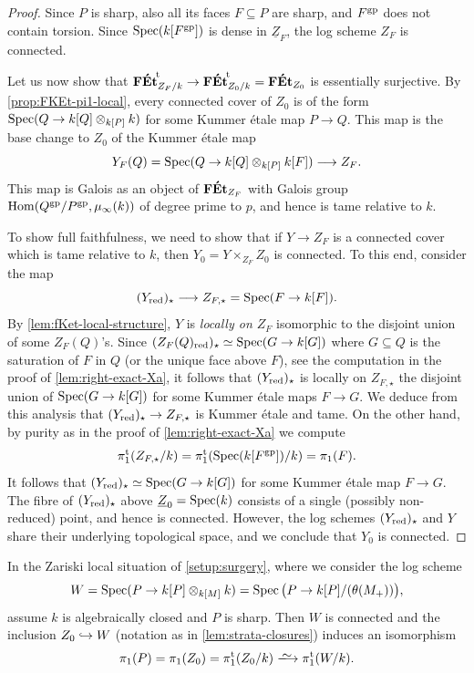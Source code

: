 \begin{proof}
Since $P$ is sharp, also all its faces $F \subseteq P$ are sharp, and $F^{\rm gp}$ does not contain torsion. Since $\operatorname{Spec}(k[F^{\rm gp}])$ is dense in $\underline{Z}_F$, the log scheme $Z_F$ is connected. 

Let us now show that ${\mathbf{F\acute{E}t}}^{\!\mathrm{t}}_{Z_F/k}\to {\mathbf{F\acute{E}t}}^{\!\mathrm{t}}_{Z_0/k} = \mathbf{F\acute{E}t}_{Z_0}$ is essentially surjective. By \cref{prop:FKEt-pi1-local}, every connected cover of $Z_0$ is of the form $\operatorname{Spec}(Q\to k[Q]\otimes_{k[P]} k)$ for some Kummer \'etale map $P\to Q$. This map is the base change to $Z_0$ of the Kummer \'etale map
\[
    Y_F(Q) = \operatorname{Spec}(Q \to k[Q] \otimes_{k[P]} k[F]) \longrightarrow Z_F.
\]
This map is Galois as an object of $\mathbf{F\acute{E}t}_{Z_F}$ with Galois group $\operatorname{Hom}(Q^{\rm gp}/P^{\rm gp},\mu_\infty(k))$ 
of degree prime to $p$, and hence is tame relative to $k$. 

To show full faithfulness, we need to show that if $Y \to Z_F$ is a connected cover which is tame relative to $k$, then $Y_0 = Y \times_{Z_F} Z_0$ is connected. To this end, consider the map 
\[
    (Y_{\rm red})_\star \longrightarrow Z_{F,\star} = \operatorname{Spec}(F \to k[F]).
\]
By \cref{lem:fKet-local-structure}, $Y$ is \emph{locally on $Z_F$} isomorphic to the disjoint union of some $Z_F(Q)$'s. Since $(Z_F(Q)_{\rm red})_\star \simeq \operatorname{Spec}(G\to k[G])$ where $G \subseteq Q$ is the saturation of $F$ in $Q$ (or the unique face above $F$), see the computation in the proof of \cref{lem:right-exact-Xa}, it follows that $(Y_{\rm red})_\star$ is locally on $Z_{F,\star}$ the disjoint union of $\operatorname{Spec}(G \to k[G])$ for some Kummer \'etale maps $F \to G$. We deduce from this analysis that $(Y_{\rm red})_\star \to Z_{F,\star}$ is Kummer \'etale and tame. 
On the other hand, by purity as in the proof of \cref{lem:right-exact-Xa} we compute 
\[
\pi_1^{\mathrm{t}}(Z_{F,\star}/k) = \pi_1^{\mathrm{t}}(\operatorname{Spec}(k[F^{\rm gp}])/k) = \pi_1(F).
\]
It follows that 
$(Y_{\rm red})_\star \simeq \operatorname{Spec}(G\to k[G])$
for some Kummer \'etale map $F\to G$. The fibre of $(Y_{\rm red})_\star$ above $\underline{Z}_0=\operatorname{Spec}(k)$ consists of a single (possibly non-reduced) point, and hence is connected. However, the log schemes $(Y_{\rm red})_\star$ and $Y$ share their underlying topological space, and we conclude that $Y_0$ is connected.
\end{proof}

\begin{cor} \label{cor:Paul}
    In the Zariski local situation of \cref{setup:surgery}, where we consider the log scheme  
    \[
         W = \operatorname{Spec}(P\to k[P]\otimes_{k[M]} k) = \operatorname{Spec}\big(P\to k[P]/(\theta(M_+))\big),
    \]  
    assume $k$ is algebraically closed and $P$ is sharp. Then $W$ is connected and the inclusion $Z_0 \hookrightarrow W$ (notation as in \cref{lem:strata-closures}) induces an isomorphism
    \[
        \pi_1(P) = \pi_1(Z_0) = \pitame(Z_0/k) \isomto \pitame(W/k). 
    \]   
\end{cor}


